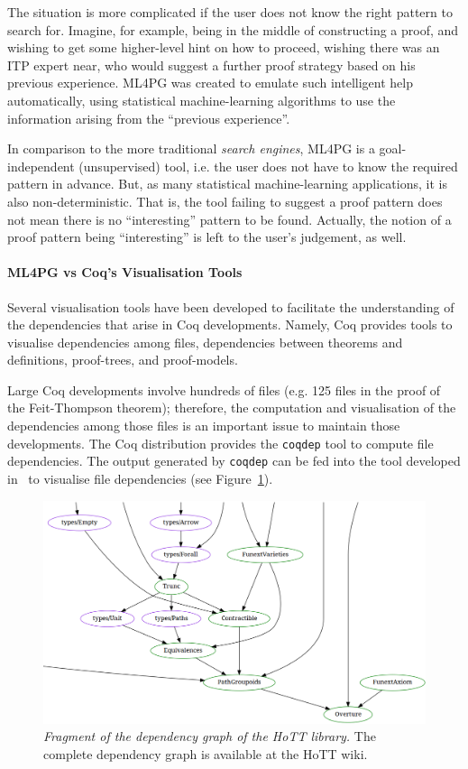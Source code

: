 The situation is more complicated if the user does not know the right pattern to search for. Imagine, for example, being in the middle of constructing a proof, 
and wishing to get some higher-level hint on how to proceed, wishing there was an ITP expert near, who would suggest a further proof strategy based on his previous experience. ML4PG was created to emulate such intelligent help automatically, using statistical machine-learning algorithms to use the information arising from the ``previous experience''.

In comparison to the more traditional \emph{search engines}, ML4PG is a goal-independent (unsupervised) tool, i.e. the user does not have to know the required pattern in advance. But, as many statistical machine-learning applications, it is also non-deterministic. That is, the tool failing to suggest a proof pattern does not mean there is no ``interesting'' pattern to be found. Actually, the notion of a proof pattern being ``interesting'' is left to the user's judgement, as well. 

\paragraph{ML4PG vs Coq's Visualisation Tools} Several visualisation tools have been developed to facilitate the understanding
of the dependencies that arise in Coq developments. Namely, Coq provides tools to visualise dependencies among files, dependencies 
between theorems and definitions, proof-trees, and proof-models.

Large Coq developments involve hundreds of files (e.g. 125 files in the proof of the Feit-Thompson theorem); therefore, the 
computation and visualisation of the dependencies among those files is an important issue to maintain those developments. The 
Coq distribution provides the \lstinline?coqdep? tool to compute file dependencies. The output generated by \lstinline?coqdep? 
can be fed into the tool developed in~\cite{dependtohtml} to visualise file dependencies (see Figure~\ref{fig:depend-files}). 

\begin{figure}[t]
\centering 
\includegraphics[scale=.4]{HoTTCorefragment.png}
\caption{\scriptsize{\emph{Fragment of the dependency graph of the HoTT library.} The complete dependency graph is available at the HoTT wiki\protect\cite{hottbook}.}}\label{fig:depend-files}
\end{figure}

